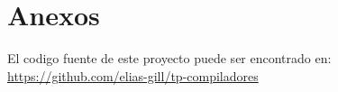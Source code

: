 \documentclass[12pt,a4paper]{article}
\begin{document}

\begin{titlepage}
	
\end{titlepage}
\newpage


\tableofcontents
\newpage








\section*{Anexos}
El codigo fuente de este proyecto puede ser encontrado en: 
\href{https://github.com/elias-gill/tp-compiladores}{https://github.com/elias-gill/tp-compiladores}

\end{document}
